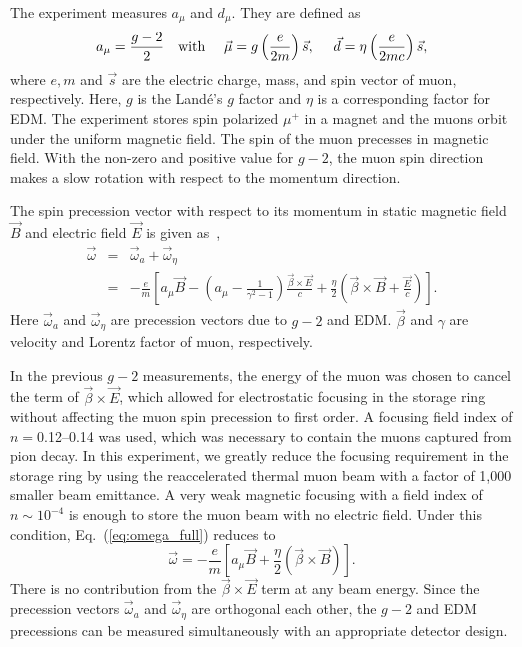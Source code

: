 The experiment measures $a_{\mu}$ and $d_{\mu}$. They are defined as 
\begin{equation}
a_{\mu} = \frac{g-2}{2} ~~~ {\rm with} ~~~~ \vec{\mu} = g \left( \frac{e}{2m}
                  \right) \vec{s}, ~~~~
\vec{d} = \eta \left( \frac{e}{2mc}
                  \right) \vec{s},
\end{equation}
where $e, m$ and $\vec{s}$ are the electric charge, mass, and spin vector of muon, respectively.
Here, $g$ is the Land\'e's $g$ factor and $\eta$ is a corresponding factor for EDM.
The experiment stores spin polarized $\mu^{+}$ in a magnet and 
the muons orbit under the uniform magnetic field. 
The spin of the muon precesses in magnetic field. 
With the non-zero and positive value for $g-2$,
the muon spin direction makes a slow rotation 
with respect to the momentum direction. 

The spin precession vector with respect to its momentum 
in static magnetic field $\vec{B}$ and electric field $\vec{E}$
is given as~\cite{Fukuyama:2016xpk, Fukuyama:2016zsi, Silenko:2017iyv},
\begin{eqnarray} 
\vec{\omega} & = & \vec{\omega}_{a} + \vec{\omega}_{\eta} \\ 
             & = & 
  - \frac{e}{m}\left[a_{\mu} \vec{B} - 
   \left( a_{\mu}- \frac{1}{\gamma^2-1} \right)
   \frac{\vec{\beta} \times \vec{E}}{c}
  +\frac{\eta}{2} 
   \left(\vec{\beta} \times \vec{B}  + \frac{\vec{E}}{c}
   \right)
   \right].
\label{eq:omega_full}
\end{eqnarray}
Here $\vec{\omega}_{a}$ and $\vec{\omega}_{\eta}$ are precession vectors
due to $g-2$ and EDM. $\vec{\beta}$ and $\gamma$ are velocity and Lorentz factor of muon,
respectively.

In the previous $g-2$ measurements, the energy of the muon
was chosen to cancel the term of $\vec{\beta} \times \vec{E}$,
which allowed for electrostatic focusing in the storage ring 
without affecting the muon spin precession to first order. 
A focusing field index of $n =$0.12--0.14 was used, 
which was necessary to contain the muons captured from pion decay. 
In this experiment, we greatly reduce the focusing requirement 
in the storage ring by using the reaccelerated thermal muon beam with a factor of 1,000 smaller beam emittance.
A very weak magnetic focusing with a field index of $n \sim 10^{-4}$
is enough to store the muon beam with no electric field.
Under this condition, Eq.~(\ref{eq:omega_full}) reduces to
\begin{equation}
\vec{\omega}  =  
  - \frac{e}{m}\left[a_{\mu} \vec{B} 
  +\frac{\eta}{2} 
   \left(\vec{\beta} \times \vec{B} \right) 
   \right].
\label{eq:omega_tot}
\end{equation}
There is no contribution from the $\vec{\beta} \times \vec{E}$ term at any beam energy.
Since the precession vectors $\vec{\omega}_{a}$ and $\vec{\omega}_{\eta}$ 
are orthogonal each other, the $g-2$ and EDM precessions 
can be measured simultaneously with
an appropriate detector design.

